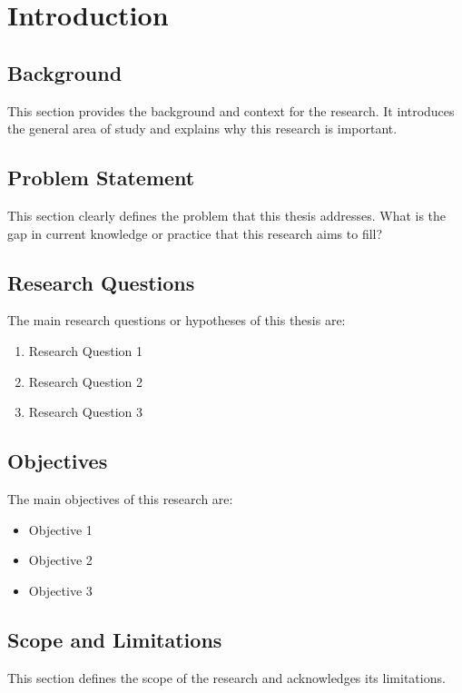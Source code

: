 \chapter{Introduction}
\label{ch:introduction}

\section{Background}
This section provides the background and context for the research. It introduces the general area of study and explains why this research is important.

\section{Problem Statement}
This section clearly defines the problem that this thesis addresses. What is the gap in current knowledge or practice that this research aims to fill?

\section{Research Questions}
The main research questions or hypotheses of this thesis are:
\begin{enumerate}
    \item Research Question 1
    \item Research Question 2
    \item Research Question 3
\end{enumerate}

\section{Objectives}
The main objectives of this research are:
\begin{itemize}
    \item Objective 1
    \item Objective 2
    \item Objective 3
\end{itemize}

\section{Scope and Limitations}
This section defines the scope of the research and acknowledges its limitations.

